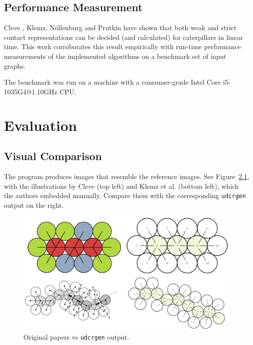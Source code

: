 \documentclass[draft,final]{vutinfth} %
\begin{document}
\section{Performance Measurement}

Cleve \cite{Cleve2020}, Klemz, Nöllenburg and Prutkin \cite{Klemz2015} have shown that both weak and strict contact representations can be decided (and calculated) for caterpillars in linear time. This work corroborates this result empirically with run-time performance measurements of the implemented algorithms on a benchmark set of input graphs.

The benchmark was run on a machine with a consumer-grade Intel Core i5-1035G4@1.10GHz CPU.


\chapter{Evaluation}

\section{Visual Comparison}

The program produces images that resemble the reference images. See Figure~\ref{fig:visual_comparison}, with the illustrations by Cleve \cite{Cleve2020} (top left) and Klemz et al. \cite{Klemz2015} (bottom left), which the authors embedded manually. Compare them with the corresponding \texttt{udcrgen} output on the right. 

\begin{figure}
    \centering
    \includegraphics[width=\textwidth]{graphics/visual_comparison.png}
    \caption{Original papers vs \texttt{udcrgen} output.}
    \label{fig:visual_comparison}
\end{figure}
\end{document}
